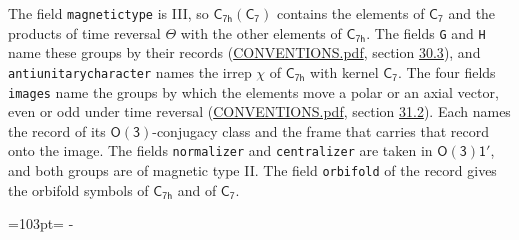 \documentclass[10pt,a4paper]{article}
\newcommand{\needspace}[1]{\par\penalty-100\begingroup\dimen0=#1\relax\dimen2=\pagegoal
  \advance\dimen2-\pagetotal\ifdim\dimen0>\dimen2\relax\ifdim\dimen2>0pt\vfil\break\fi\fi
  \endgroup}
\numberwithin{equation}{section}
\newcommand{\grp}[1]{\mathsf{#1}}
\begin{document}
The field \texttt{magnetictype} is III, so $\grp{C_{7h}}(\grp{C_{7}})$ contains the elements of $\grp{C_{7}}$ and the products of time reversal $\varTheta$ with the other elements of $\grp{C_{7h}}$. The fields \texttt{G} and \texttt{H} name these groups by their records (\href{../../CONVENTIONS.pdf}{CONVENTIONS.pdf}, section \href{../../CONVENTIONS.pdf\#conv.30.3}{30.3}), and \texttt{antiunitarycharacter} names the irrep $\chi$ of $\grp{C_{7h}}$ with kernel $\grp{C_{7}}$. The four fields \texttt{images} name the groups by which the elements move a polar or an axial vector, even or odd under time reversal (\href{../../CONVENTIONS.pdf}{CONVENTIONS.pdf}, section \href{../../CONVENTIONS.pdf\#conv.31.2}{31.2}). Each names the record of its $\grp{O(3)}$-conjugacy class and the frame that carries that record onto the image. The fields \texttt{normalizer} and \texttt{centralizer} are taken in $\grp{O(3)1'}$, and both groups are of magnetic type II. The field \texttt{orbifold} of the record gives the orbifold symbols of $\grp{C_{7h}}$ and of $\grp{C_{7}}$.
\needspace{103pt}
\end{document}
